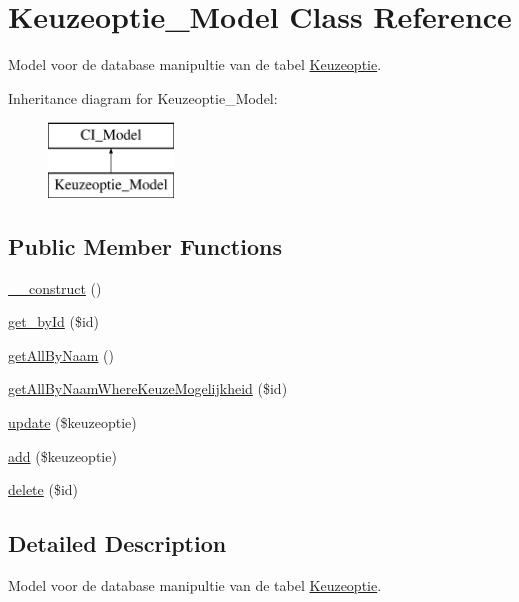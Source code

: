 \hypertarget{class_keuzeoptie___model}{}\section{Keuzeoptie\+\_\+\+Model Class Reference}
\label{class_keuzeoptie___model}


Model voor de database manipultie van de tabel \mbox{\hyperlink{class_keuzeoptie}{Keuzeoptie}}.  


Inheritance diagram for Keuzeoptie\+\_\+\+Model\+:\begin{figure}[H]
\begin{center}
\leavevmode
\includegraphics[height=2.000000cm]{class_keuzeoptie___model}
\end{center}
\end{figure}
\subsection*{Public Member Functions}
\begin{DoxyCompactItemize}
\item 
\mbox{\hyperlink{class_keuzeoptie___model_a095c5d389db211932136b53f25f39685}{\+\_\+\+\_\+construct}} ()
\item 
\mbox{\hyperlink{class_keuzeoptie___model_a98d28a4d9a29d40c5a8aa0176f19a919}{get\+\_\+by\+Id}} (\$id)
\item 
\mbox{\hyperlink{class_keuzeoptie___model_a2b035b1ffd1cbe651b35bb3e53d72c09}{get\+All\+By\+Naam}} ()
\item 
\mbox{\hyperlink{class_keuzeoptie___model_a6f3e4d26ab480501524eabb01683f5f7}{get\+All\+By\+Naam\+Where\+Keuze\+Mogelijkheid}} (\$id)
\item 
\mbox{\hyperlink{class_keuzeoptie___model_a9d98d1a6c3919a0e7b946d37fa385948}{update}} (\$keuzeoptie)
\item 
\mbox{\hyperlink{class_keuzeoptie___model_a2452f524e794bc3f418d60cb296e19b5}{add}} (\$keuzeoptie)
\item 
\mbox{\hyperlink{class_keuzeoptie___model_a2f8258add505482d7f00ea26493a5723}{delete}} (\$id)
\end{DoxyCompactItemize}


\subsection{Detailed Description}
Model voor de database manipultie van de tabel \mbox{\hyperlink{class_keuzeoptie}{Keuzeoptie}}. 

